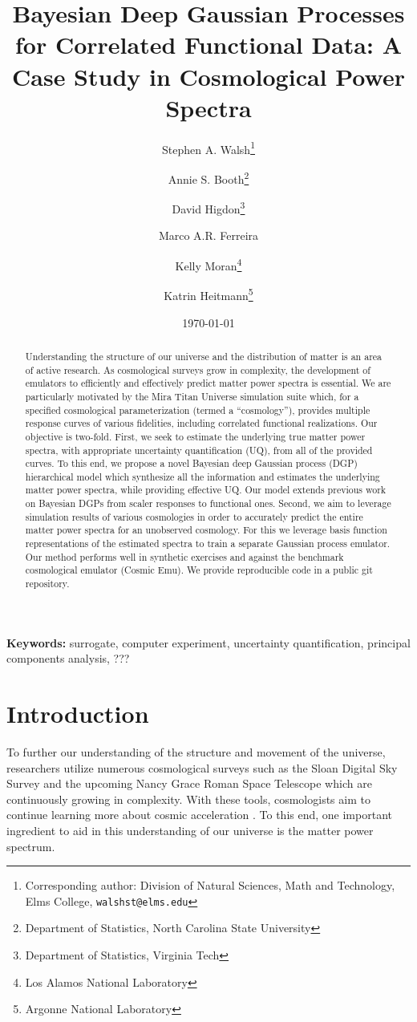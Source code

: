 \documentclass[11pt]{article}
\title{Bayesian Deep Gaussian Processes for Correlated Functional Data: 
        A Case Study in Cosmological Power Spectra}
\author{Stephen A. Walsh\thanks{Corresponding author: Division of Natural Sciences, 
        Math and Technology, Elms College, {\tt walshst@elms.edu}} \and 
        Annie S. Booth\thanks{Department of Statistics, North Carolina State University} \and
        David Higdon\thanks{Department of Statistics, Virginia Tech} \and
        Marco A.R. Ferreira\footnotemark[3] \and
        Kelly Moran\thanks{Los Alamos National Laboratory} \and
        Katrin Heitmann\thanks{Argonne National Laboratory}}
\date{\today}
\begin{document}
\maketitle
\bigskip

\begin{abstract} 
Understanding the structure of our universe and the distribution of matter is an 
area of active research.  As cosmological surveys grow in complexity, the development 
of emulators to efficiently and effectively predict matter power spectra is essential.  
We are particularly motivated by the Mira Titan Universe simulation
suite which, for a specified cosmological parameterization (termed a ``cosmology''), 
provides multiple response curves of various fidelities, including correlated 
functional realizations.  Our objective is two-fold.  First, we seek to 
estimate the underlying true matter power spectra, with appropriate uncertainty 
quantification (UQ), from all of the provided curves.  To this end, we propose a 
novel Bayesian deep Gaussian process (DGP) hierarchical model which synthesize 
all the information and estimates the underlying matter power spectra, while providing 
effective UQ.  Our model extends previous work on Bayesian DGPs from scaler responses 
to functional ones.  Second, we aim to leverage simulation results of various 
cosmologies in order to accurately predict the entire matter power spectra for an 
unobserved cosmology.  For this we leverage basis function representations 
of the estimated spectra to train a separate Gaussian process emulator.  
Our method performs well in synthetic exercises and against the benchmark cosmological 
emulator (Cosmic Emu).  We provide reproducible code in a public git repository.
\end{abstract}

\noindent \textbf{Keywords:} surrogate, computer experiment, uncertainty quantification,
principal components analysis, ???


\section{Introduction}

To further our understanding of the structure and movement of the universe, researchers utilize numerous cosmological surveys such as the Sloan Digital Sky Survey \citep{york2000sloan} and the upcoming Nancy Grace Roman Space Telescope \citep{Dore2019WFIRST} which are continuously growing in complexity. With these tools, cosmologists aim to continue learning more about cosmic acceleration \citep{caldwell2009physics}. To this end, one important ingredient to aid in this understanding of our universe is the matter power spectrum. 
\end{document}
